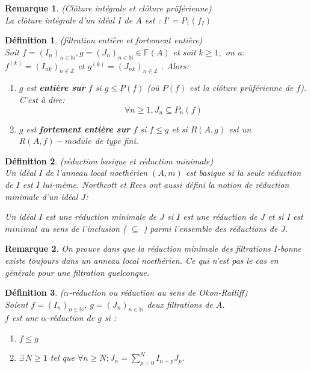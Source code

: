\documentclass[12pt, a4paper, oneside]{article}
\newtheorem{maremarque}{Remarque}
\newtheorem{madefinition}{Définition}
\begin{document}
	\begin{maremarque} (Clôture intégrale et clôture prüférienne) \\
		La clôture intégrale d'un idéal $I$ de $A$ est : $I'=P_1(f_I)$
	\end{maremarque}
	\begin{madefinition}(filtration entière et fortement entière)\\
		Soit $f=(I_n)_{n \in \mathbb{N}} , g = (J_n)_{n \in \mathbb{N}}\in \mathbb{F}(A)$ et soit $k\geq 1,$ on a: $f^{(k)}=(I_{nk})_{n\in \mathbb{Z}}$ et $g^{(k)}=(J_{nk})_{n\in \mathbb{Z}}$ .  Alors:\\
		\begin{enumerate}
			\item[(a)]$g$ est \textbf{entière sur} $f$ si $g \leqslant P(f)$ (où $P(f)$ est la clôture prüférienne de $f$). C'est à dire:
			\[\forall n \geqslant 1, J_n \subseteq P_{n}(f) \]
			\item[(b)]$g$ est \textbf{fortement entière sur} $f$ si $f \leqslant g$ et si $R(A,g)$ est un $R(A,f)-module$ de type fini.
		\end{enumerate}
	\end{madefinition}
	\begin{madefinition} (réduction basique et réduction minimale) \\
		Un idéal $I$ de l'anneau local noethérien $(A,m)$ est basique si la seule réduction de $I$ est $I$ lui-m\^{e}me. 
		Northcott et Rees ont aussi défini la notion de réduction minimale
		d'un idéal $J$:
		
		Un idéal $I$ est une réduction minimale de $J$ si $I$ est une réduction de $J$ et si I est $minimal$ au sens de l'inclusion ( $\subseteq$ ) parmi l'ensemble des réductions de J. 
	\end{madefinition}
	\begin{maremarque}
		On prouve dans \cite{Di2} que la réduction minimale des filtrations $I$-bonne existe toujours dans un anneau local noethérien. Ce qui n'est pas le cas en générale pour une filtration quelconque.
	\end{maremarque}
	\begin{madefinition}($\alpha$-réduction ou réduction au sens de Okon-Ratliff)\\
		Soient $f=(I_n)_{n \in \mathbb{N}}$, $g=(J_n)_{n \in \mathbb{N}}$ deux filtrations de $A$.\\
		$f$ est une $\alpha$-réduction de $g$ si : \\
		\begin{enumerate}
			\item[i)] $f \leq g$
			\item[ii)] $\exists \, N \geq 1$ tel que $\forall n \geq N ; J_n = \displaystyle \sum_{p=0}^{N}{I_{n-p} J_p}$.
		\end{enumerate}
	\end{madefinition}
\end{document}
